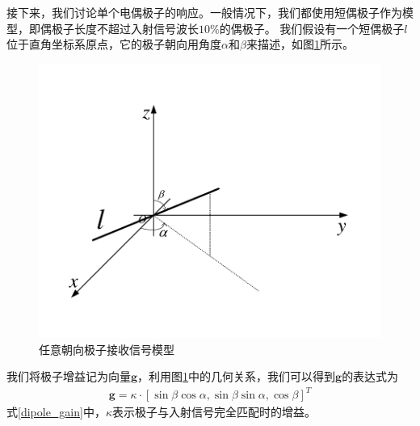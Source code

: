 \documentclass[master]{thesis-uestc}
\begin{document}
接下来，我们讨论单个电偶极子的响应。一般情况下，我们都使用短偶极子作为模型，即偶极子长度不超过入射信号波长$10\%$的偶极子。
我们假设有一个短偶极子$l$位于直角坐标系原点，它的极子朝向用角度$\alpha$和$\beta$来描述，如图\ref{dipole_model}所示。
\begin{figure}[h]
    \includegraphics[scale=0.8]{pic/dipole.pdf}
    \caption{任意朝向极子接收信号模型}
    \label{dipole_model}
\end{figure}
我们将极子增益记为向量$\bm{g}$，利用图\ref{dipole_model}中的几何关系，我们可以得到$\bm{g}$的表达式为
\begin{equation}\label{dipole_gain}
    \begin{aligned}
        \bm{g}=\kappa \cdot[\sin \beta \cos \alpha, \sin \beta \sin \alpha, \cos \beta]^{T}
    \end{aligned}
\end{equation}
式\eqref{dipole_gain}中，$\kappa$表示极子与入射信号完全匹配时的增益。
\end{document}

